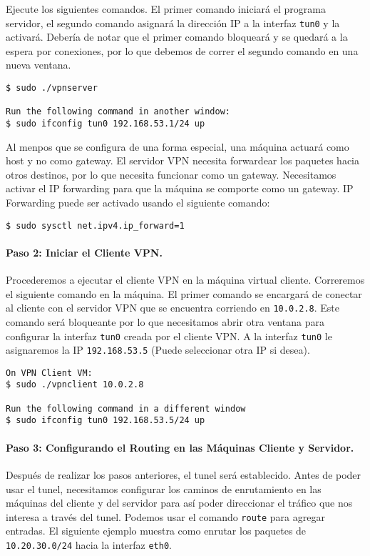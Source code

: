Ejecute los siguientes comandos. El primer comando iniciará el programa servidor, el segundo comando asignará la dirección IP a la interfaz \texttt{tun0} y la activará. Debería de notar que el primer comando bloqueará y se quedará a la espera por conexiones, por lo que debemos de correr el segundo comando en una nueva ventana.


\begin{lstlisting}
$ sudo ./vpnserver

Run the following command in another window:
$ sudo ifconfig tun0 192.168.53.1/24 up
\end{lstlisting}

Al menpos que se configura de una forma especial, una máquina actuará como host y no como gateway. El servidor VPN necesita forwardear los paquetes hacia otros destinos, por lo que necesita funcionar como un gateway. Necesitamos activar el IP forwarding para que la máquina se comporte como un gateway.
IP Forwarding puede ser activado usando el siguiente comando:


\begin{lstlisting}
$ sudo sysctl net.ipv4.ip_forward=1
\end{lstlisting}



\paragraph{Paso 2: Iniciar el Cliente VPN.} 
Procederemos a ejecutar el cliente VPN en la máquina virtual cliente. Correremos el siguiente comando en la máquina. El primer comando se encargará de conectar al cliente con el servidor VPN que se encuentra corriendo en {\tt 10.0.2.8}. Este comando será bloqueante por lo que necesitamos abrir otra ventana para configurar la interfaz \texttt{tun0} creada por el cliente VPN.
A la interfaz \texttt{tun0} le asignaremos la IP \texttt{192.168.53.5} (Puede seleccionar otra IP si desea).


\begin{lstlisting}
On VPN Client VM:
$ sudo ./vpnclient 10.0.2.8

Run the following command in a different window
$ sudo ifconfig tun0 192.168.53.5/24 up
\end{lstlisting}



\paragraph{Paso 3: Configurando el Routing en las Máquinas Cliente y Servidor.}
Después de realizar los pasos anteriores, el tunel será establecido.
Antes de poder usar el tunel, necesitamos configurar los caminos de enrutamiento en las máquinas del cliente y del servidor para así poder direccionar el tráfico que nos interesa a través del tunel.
Podemos usar el comando \texttt{route} para agregar entradas. El siguiente ejemplo muestra como enrutar los paquetes de \texttt{10.20.30.0/24} hacia la interfaz \texttt{eth0}.


